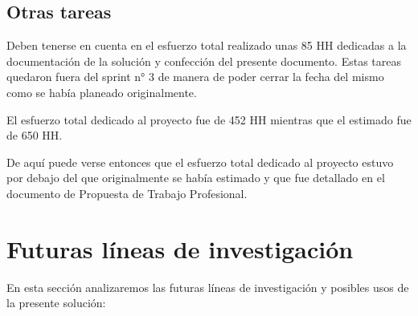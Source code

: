 \documentclass[12pt,a4paper]{article}
\let\stdsection\section
\renewcommand\section{\newpage\stdsection}
\begin{document}
\subsection{Otras tareas}

	Deben tenerse en cuenta en el esfuerzo total realizado unas 85 HH dedicadas a la documentación de la solución y
	confección del presente documento. Estas tareas quedaron fuera del sprint n° 3 de manera de poder cerrar la fecha del
	mismo como se había planeado originalmente.
	
	El esfuerzo total dedicado al proyecto fue de 452 HH mientras que el estimado fue de 650 HH.

	De aquí puede verse entonces que el esfuerzo total dedicado al proyecto estuvo por debajo del que 
	originalmente se había estimado y que fue detallado en el documento de Propuesta de Trabajo Profesional.

\section{Futuras líneas de investigación}

En esta sección analizaremos las futuras líneas de investigación y posibles usos de la presente solución:
\end{document}
